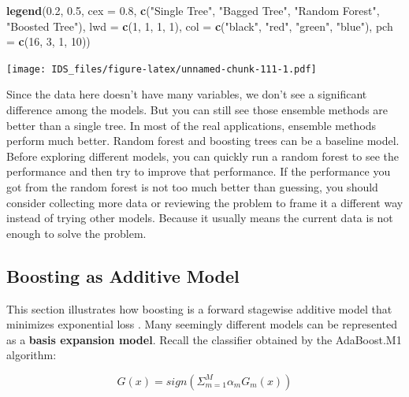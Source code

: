 \documentclass[12pt,]{krantz}
\makeatletter
\newenvironment{Shaded}{\begin{snugshade}}{\end{snugshade}}
\newcommand{\DataTypeTok}[1]{\textcolor[rgb]{0.27,0.27,0.27}{#1}}
\newcommand{\DecValTok}[1]{\textcolor[rgb]{0.06,0.06,0.06}{#1}}
\newcommand{\FloatTok}[1]{\textcolor[rgb]{0.06,0.06,0.06}{#1}}
\newcommand{\KeywordTok}[1]{\textcolor[rgb]{0.27,0.27,0.27}{\textbf{#1}}}
\newcommand{\NormalTok}[1]{#1}
\newcommand{\StringTok}[1]{\textcolor[rgb]{0.5,0.5,0.5}{#1}}
\newenvironment{kframe}{%
\medskip{}
\setlength{\fboxsep}{.8em}
 \def\at@end@of@kframe{}%
 \ifinner\ifhmode%
  \def\at@end@of@kframe{\end{minipage}}%
  \begin{minipage}{\columnwidth}%
 \fi\fi%
 \def\FrameCommand##1{\hskip\@totalleftmargin \hskip-\fboxsep
 \colorbox{shadecolor}{##1}\hskip-\fboxsep
     \hskip-\linewidth \hskip-\@totalleftmargin \hskip\columnwidth}%
 \MakeFramed {\advance\hsize-\width
   \@totalleftmargin\z@ \linewidth\hsize
   \@setminipage}}%
 {\par\unskip\endMakeFramed%
 \at@end@of@kframe}
\renewenvironment{Shaded}{\begin{kframe}}{\end{kframe}}
\makeatother
\begin{document}
\begin{Shaded}
\begin{Highlighting}[]
\KeywordTok{legend}\NormalTok{(}\FloatTok{0.2}\NormalTok{, }\FloatTok{0.5}\NormalTok{, }\DataTypeTok{cex =} \FloatTok{0.8}\NormalTok{,}
       \KeywordTok{c}\NormalTok{(}\StringTok{"Single Tree"}\NormalTok{, }\StringTok{"Bagged Tree"}\NormalTok{, }\StringTok{"Random Forest"}\NormalTok{, }\StringTok{"Boosted Tree"}\NormalTok{),}
       \DataTypeTok{lwd =} \KeywordTok{c}\NormalTok{(}\DecValTok{1}\NormalTok{, }\DecValTok{1}\NormalTok{, }\DecValTok{1}\NormalTok{, }\DecValTok{1}\NormalTok{),}
       \DataTypeTok{col =} \KeywordTok{c}\NormalTok{(}\StringTok{"black"}\NormalTok{, }\StringTok{"red"}\NormalTok{, }\StringTok{"green"}\NormalTok{, }\StringTok{"blue"}\NormalTok{),}
       \DataTypeTok{pch =} \KeywordTok{c}\NormalTok{(}\DecValTok{16}\NormalTok{, }\DecValTok{3}\NormalTok{, }\DecValTok{1}\NormalTok{, }\DecValTok{10}\NormalTok{))}
\end{Highlighting}
\end{Shaded}

\texttt{[image: IDS\_files/figure-latex/unnamed-chunk-111-1.pdf]}

Since the data here doesn't have many variables, we don't see a significant difference among the models. But you can still see those ensemble methods are better than a single tree. In most of the real applications, ensemble methods perform much better. Random forest and boosting trees can be a baseline model. Before exploring different models, you can quickly run a random forest to see the performance and then try to improve that performance. If the performance you got from the random forest is not too much better than guessing, you should consider collecting more data or reviewing the problem to frame it a different way instead of trying other models. Because it usually means the current data is not enough to solve the problem.

\hypertarget{boosting-as-additive-model}{%
\subsection{Boosting as Additive Model}\label{boosting-as-additive-model}}

This section illustrates how boosting is a forward stagewise additive model that minimizes exponential loss \citep{Friedman2000}. Many seemingly different models can be represented as a \textbf{basis expansion model}. Recall the classifier obtained by the AdaBoost.M1 algorithm:

\[G(x)=sign ( \Sigma_{m=1}^M \alpha_{m}G_m(x))\]
\end{document}
